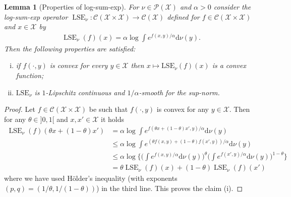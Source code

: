 \documentclass[11pt]{article}
\newcommand{\rev}[1]{{#1}}
\newcommand{\Cc}{\mathcal{C}}
\newcommand{\Pp}{\mathcal{P}}
\newcommand{\Xx}{\mathcal{X}}
\renewcommand{\d}{\mathrm{d}}
\DeclareMathOperator{\LSE}{LSE}
\newtheorem{lemma}[theorem]{Lemma}
\begin{document}
\rev{
\begin{lemma}[Properties of log-sum-exp]\label{lem:LSE}
For $\nu\in \Pp(\Xx)$ and $\alpha>0$ consider the log-sum-exp operator $\LSE_\nu : 
\Cc(\Xx\times \Xx) \to \Cc(\Xx)$ defined for $f\in \Cc(\Xx\times \Xx)$ and $x\in \Xx$ by
\begin{align}
\LSE_\nu(f)(x) = \alpha \log \int e^{f(x,y)/\alpha}\d\nu(y).
\end{align}
Then the following properties are satisfied:
\begin{enumerate}[(i)]
\item if $f(\cdot,y)$ is convex for every $y\in \Xx$ then $x\mapsto \mathrm{LSE}_\nu(f)(x)$ is a convex function;
\item $\mathrm{LSE}_\nu$ is $1$-Lipschitz continuous and  $1/\alpha$-smooth for the sup-norm.
\end{enumerate}
\end{lemma}
\begin{proof}
Let $f\in \Cc(\Xx\times \Xx)$ be such that $f(\cdot,y)$ is convex for any $y \in \Xx$. Then for any $\theta \in ]0,1[$ and $x,x'\in \Xx$ it holds
\begin{align*}
\LSE_\nu(f)(\theta x+(1-\theta)x') &= \alpha \log \int e^{f(\theta x+(1-\theta)x',y)/\alpha}\d\nu(y)\\
&\leq  \alpha \log \int e^{(\theta f(x,y)+(1-\theta)f(x',y))/\alpha}\d\nu(y)\\
&\leq  \alpha \log \Big\{\Big(\int e^{f(x,y)/\alpha}\d\nu(y)\Big)^{\theta}\Big(\int e^{f(x',y)/\alpha}\d\nu(y)\Big)^{1-\theta}\Big\}\\
&=\theta \LSE_\nu(f)(x) + (1-\theta) \LSE_\nu(f)(x')
\end{align*}
where we have used Hölder's inequality (with exponents $(p,q)=(1/\theta,1/(1-\theta))$) in the third line. This proves the claim (i).


\end{proof}}
\end{document}
